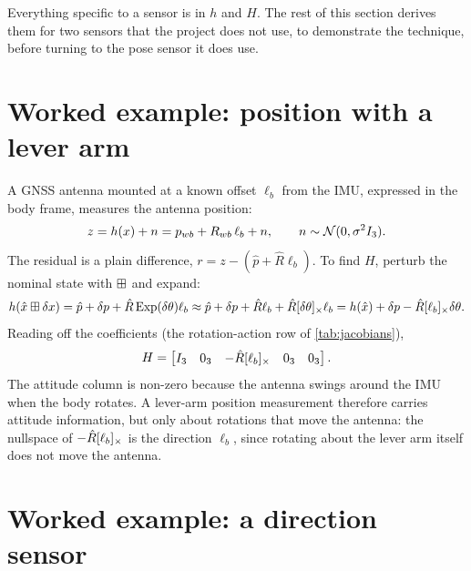 Everything specific to a sensor is in $h$ and $H$. The rest of this section derives them for two sensors that the
project does not use, to demonstrate the technique, before turning to the pose sensor it does use.

\section{Worked example: position with a lever arm}

A GNSS antenna mounted at a known offset $\ell_b$ from the IMU, expressed in the body frame, measures the
antenna position:
\begin{equation}
  z = h(x) + n = p_{wb} + R_{wb}\,\ell_b + n, \qquad n \sim \mathcal{N}(0, \sigma^2I_3).
\end{equation}
The residual is a plain difference, $r = z - (\hat p + \hat R\ell_b)$. To find $H$, perturb the nominal state with
$\boxplus$ and expand:
\begin{equation*}
  h(\hat x\boxplus\delta x) = \hat p + \delta p + \hat R\operatorname{Exp}(\delta\theta)\ell_b
  \approx \hat p + \delta p + \hat R\ell_b + \hat R[\delta\theta]_{\times}\ell_b
  = h(\hat x) + \delta p - \hat R[\ell_b]_{\times}\delta\theta .
\end{equation*}
Reading off the coefficients (the rotation-action row of \cref{tab:jacobians}),
\begin{equation}
  H = \begin{bmatrix} I_3 & 0_3 & -\hat R[\ell_b]_{\times} & 0_3 & 0_3 \end{bmatrix}.
\end{equation}
The attitude column is non-zero because the antenna swings around the IMU when the body rotates. A
lever-arm position measurement therefore carries attitude information, but only about rotations that move
the antenna: the nullspace of $-\hat R[\ell_b]_{\times}$ is the direction $\ell_b$, since rotating about the lever arm itself
does not move the antenna.

\section{Worked example: a direction sensor}

